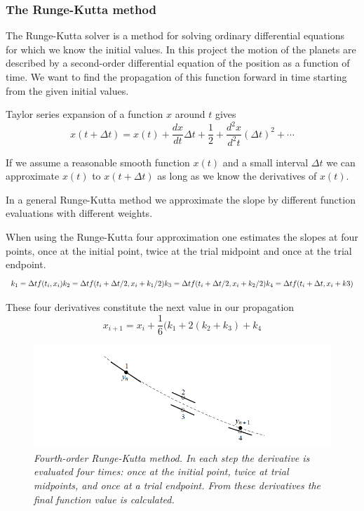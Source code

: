 \documentclass[a4paper,12pt, english]{article}
\begin{document}
 
\subsubsection*{The Runge-Kutta method}

The Runge-Kutta solver is a method for solving ordinary differential equations for which we know the initial values. In this project the motion of the planets are described by a second-order differential equation of the position as a function of time. We want to find the propagation of this function forward in time starting from the given initial values. 

Taylor series expansion of a function $x$ around $t$ gives
$$ x(t+ \Delta t) = x(t) + \frac{dx}{dt} \Delta t + \frac{1}{2} + \frac{d^2 x}{d^2 t} (\Delta t)^2 + \cdots $$

If we assume a reasonable smooth function $x(t)$ and a small interval $\Delta t$ we can approximate $x(t)$ to $x(t + \Delta t)$ as long as we know the derivatives of $x(t)$. 

In a general Runge-Kutta method we approximate the slope by different function evaluations with different weights.

When using the Runge-Kutta four approximation one estimates the slopes at four points, once at the initial point, twice at the trial midpoint and once at the trial endpoint. 
$$ k_1 = \Delta t f(t_i,x_i) \\
k_2 = \Delta t f(t_i + \Delta t /2, x_i + k_1/2) \\
k_3 = \Delta t f(t_i + \Delta t/2, x_i + k_2/2) \\
k_4 = \Delta t f(t_i + \Delta t, x_i + k3) $$

These four derivatives constitute the next value in our propagation
$$x_{i+1} = x_i + \frac{1}{6} (k_1 + 2(k_2+k_3) + k_4$$ 
  
\begin{figure}[h!]
  \centering    \includegraphics[scale=0.5]{rk4.png}
  \caption{\textit{Fourth-order Runge-Kutta method. In each step the derivative is evaluated four times:
once at the initial point, twice at trial midpoints, and once at a trial endpoint. From these derivatives the
final function value is calculated. }}
\end{figure}
\end{document}
